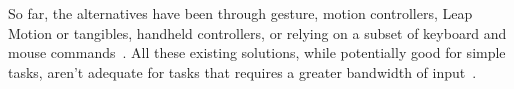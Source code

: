 So far, the alternatives have been through gesture, motion controllers, Leap Motion or tangibles, handheld controllers, or relying on a subset of keyboard and mouse commands~\cite{billinghurst1999collaborative}.
All these existing solutions, while potentially good for simple tasks, aren't adequate for tasks that requires a greater bandwidth of input~\cite{McGill:2015:DRO:2702123.2702382}.

